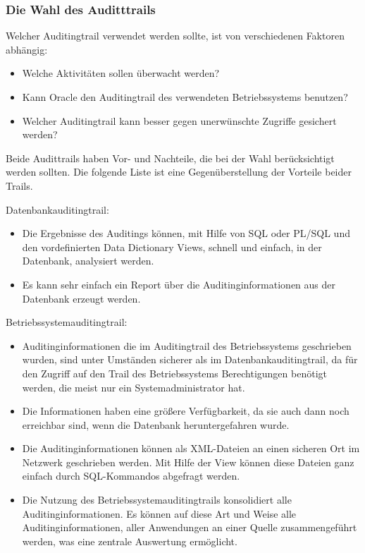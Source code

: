         \subsubsection{Die Wahl des Auditttrails}
          Welcher Auditingtrail verwendet werden sollte, ist von verschiedenen Faktoren abhängig:
          \begin{itemize}
            \item Welche Aktivitäten sollen überwacht werden?
            \item Kann Oracle den Auditingtrail des verwendeten Betriebssystems benutzen?
            \item Welcher Auditingtrail kann besser gegen unerwünschte Zugriffe gesichert werden?
          \end{itemize}
          Beide Audittrails haben Vor- und Nachteile, die bei der Wahl berücksichtigt werden sollten. Die folgende Liste ist eine Gegenüberstellung der Vorteile beider Trails.

          Datenbankauditingtrail:
          \begin{itemize}
            \item Die Ergebnisse des Auditings können, mit Hilfe von SQL oder PL/SQL und den vordefinierten Data Dictionary Views, schnell und einfach, in der Datenbank, analysiert werden.
            \item Es kann sehr einfach ein Report über die Auditinginformationen aus der Datenbank erzeugt werden.
          \end{itemize}
          Betriebssystemauditingtrail:
          \begin{itemize}
            \item Auditinginformationen die im Auditingtrail des Betriebssystems geschrieben wurden, sind unter Umständen sicherer als im Datenbankauditingtrail, da für den Zugriff auf den Trail des Betriebssystems Berechtigungen benötigt werden, die meist nur ein Systemadministrator hat.
            \item Die Informationen haben eine größere Verfügbarkeit, da sie auch dann noch erreichbar sind, wenn die Datenbank heruntergefahren wurde.
            \item Die Auditinginformationen können als XML-Dateien an einen sicheren Ort im Netzwerk geschrieben werden. Mit Hilfe der View  kön\-nen diese Dateien ganz einfach durch SQL-Kommandos abgefragt werden.
            \item Die Nutzung des Betriebssystemauditingtrails konsolidiert alle Auditinginformationen. Es können auf diese Art und Weise alle Auditinginformationen, aller Anwendungen an einer Quelle zusammengeführt werden, was eine zentrale Auswertung  ermöglicht.
          \end{itemize}
